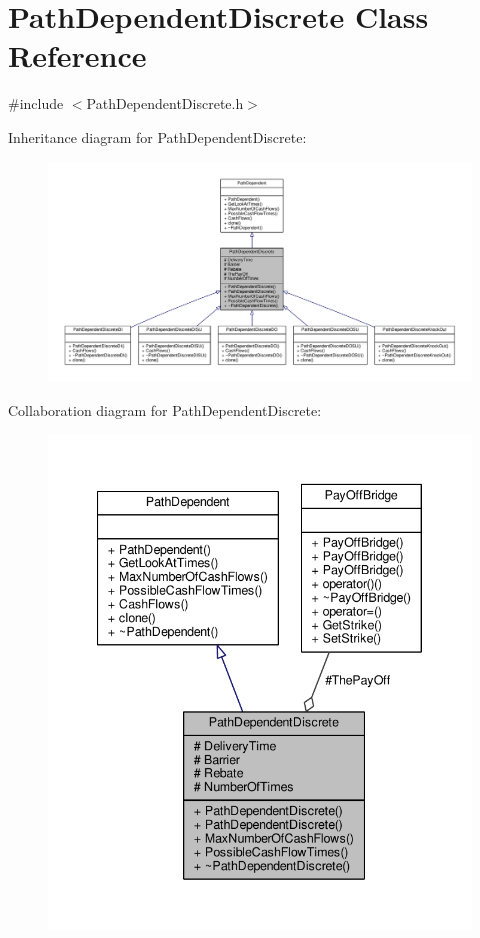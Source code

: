 \hypertarget{classPathDependentDiscrete}{}\section{Path\+Dependent\+Discrete Class Reference}
\label{classPathDependentDiscrete}


{\ttfamily \#include $<$Path\+Dependent\+Discrete.\+h$>$}



Inheritance diagram for Path\+Dependent\+Discrete\+:
\nopagebreak
\begin{figure}[H]
\begin{center}
\leavevmode
\includegraphics[width=350pt]{classPathDependentDiscrete__inherit__graph}
\end{center}
\end{figure}


Collaboration diagram for Path\+Dependent\+Discrete\+:
\nopagebreak
\begin{figure}[H]
\begin{center}
\leavevmode
\includegraphics[width=340pt]{classPathDependentDiscrete__coll__graph}
\end{center}
\end{figure}

